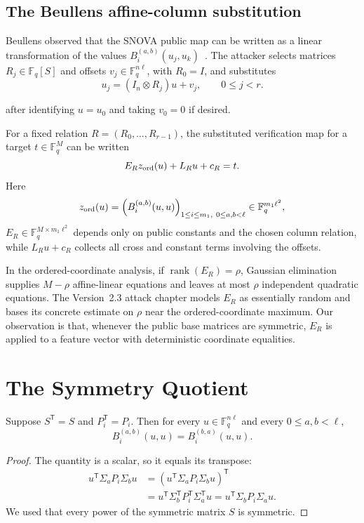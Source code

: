 \documentclass[runningheads]{llncs}
\newcommand{\F}{\mathbb F}
\newcommand{\rank}{\operatorname{rank}}
\newcommand{\transpose}{\mathsf T}
\newcommand{\SNOVA}{\textsf{SNOVA}}
\begin{document}
\subsection{The Beullens affine-column substitution}

Beullens observed that the \SNOVA{} public map can be written as a linear transformation of the values $B_i^{(a,b)}(u_j,u_k)$~\cite{Beullens2024SNOVA}.  The attacker selects matrices $R_j\in\F_q[S]$ and offsets $v_j\in\F_q^{n\ell}$, with $R_0=I$, and substitutes
\begin{equation}\label{eq:relation}
 u_j=(I_n\otimes R_j)u+v_j,
 \qquad 0\le j<r.
\end{equation}

after identifying $u=u_0$ and taking $v_0=0$ if desired.

For a fixed relation $R=(R_0,\ldots,R_{r-1})$, the substituted verification map for a target $t\in\F_q^M$ can be written
\begin{equation}\label{eq:affine-system}
 E_R z_{\rm ord}(u)+L_Ru+c_R=t.
\end{equation}
Here
\[
 z_{\rm ord}(u)
 =\left(B_i^{(a,b)}(u,u)\right)_{1\le i\le m_1,\ 0\le a,b<\ell}
 \in\F_q^{m_1\ell^2},
\]
$E_R\in\F_q^{M\times m_1\ell^2}$ depends only on public constants and the chosen column relation, while $L_Ru+c_R$ collects all cross and constant terms involving the offsets.

In the ordered-coordinate analysis, if $\rank(E_R)=\rho$, Gaussian elimination supplies $M-\rho$ affine-linear equations and leaves at most $\rho$ independent quadratic equations.  The Version~2.3 attack chapter models $E_R$ as essentially random and bases its concrete estimate on $\rho$ near the ordered-coordinate maximum.  Our observation is that, whenever the public base matrices are symmetric, $E_R$ is applied to a feature vector with deterministic coordinate equalities.

\section{The Symmetry Quotient}\label{sec:symmetry}

\begin{lemma}\label{lem:powerpair}
Suppose $S^\transpose=S$ and $P_i^\transpose=P_i$.  Then for every $u\in\F_q^{n\ell}$ and every $0\le a,b<\ell$,
\[
 B_i^{(a,b)}(u,u)=B_i^{(b,a)}(u,u).
\]
\end{lemma}

\begin{proof}
The quantity is a scalar, so it equals its transpose:
\[
 \begin{aligned}
 u^\transpose\Sigma_aP_i\Sigma_bu
 &=\left(u^\transpose\Sigma_aP_i\Sigma_bu\right)^\transpose\\
 &=u^\transpose\Sigma_b^\transpose P_i^\transpose\Sigma_a^\transpose u
 =u^\transpose\Sigma_bP_i\Sigma_au.
 \end{aligned}
\]
We used that every power of the symmetric matrix $S$ is symmetric.
\end{proof}
\end{document}
